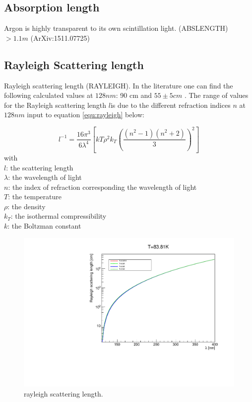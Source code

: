 \documentclass[a4paper]{jpconf}
\begin{document}
\subsection{Absorption length}
Argon is highly transparent to its own scintillation light. (ABSLENGTH)
  $> 1.1 m$  (ArXiv:1511.07725) 
  \subsection{Rayleigh Scattering length}
  Rayleigh scattering length (RAYLEIGH). In the literature one can find the following calculated values at $128 nm$:  90 cm \cite{ref:vg}
  and $55\pm  5 cm$ \cite{ref:grace}. The  range of values for the Rayleigh
scattering length $l$is due to the different refraction indices $n$ at $128nm$  input  to equation  \ref{equ:rayleigh} below:

  \begin{equation}
l^{-1} = \frac{16\pi^3}{6\lambda^4} \left[ kT \rho^2 k_T \left( \frac{(n^2 - 1)(n^2 + 2)}{3} \right)^2\right]
  \label{equ:rayleigh}
\end{equation}
\noindent
    with\\
    $l$: the scattering length\\
    $\lambda$:  the wavelength of light\\
    $n$: the index of refraction corresponding the wavelength of light\\
    $T$: the temperature \\
    $\rho$: the density \\
    $k_T$: the isothermal compressibility\\
    $k$: the Boltzman constant\\
    

  
  \begin{figure}[ht]
    \begin{center}
      \includegraphics[width=35.5pc]{rayleigh.pdf}
    \end{center}
    \caption{\label{fig:rayleigh}rayleigh scattering length.}
  \end{figure}
\end{document}
